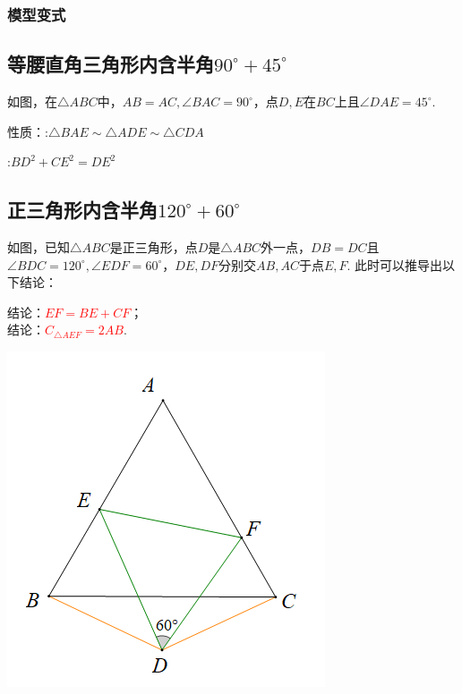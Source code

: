 \documentclass[10pt]{ctexart}
\begin{document}
\subsubsection{模型变式}



\subsection{等腰直角三角形内含半角$90^\circ +45^\circ$}
如图，在$\triangle ABC$中，$AB=AC,\angle BAC=90^\circ$，点$D,E$在$BC$上且$\angle DAE=45^\circ$.

性质：:$\triangle BAE \sim \triangle ADE \sim \triangle CDA$

:$BD^2+CE^2=DE^2$




\subsection{正三角形内含半角$120^\circ +60^\circ$}
\begin{minipage}{0.6\textwidth}
	如图，已知$\triangle ABC$是正三角形，点$D$是$\triangle ABC$外一点，$DB=DC$且$\angle BDC=120^\circ,\angle EDF=60^\circ$，$DE,DF$分别交$AB,AC$于点$E,F$.
	此时可以推导出以下结论：
	
	结论：\textcolor{red}{$EF=BE+CF$}；\\
	结论：\textcolor{red}{$C_{\triangle AEF}=2AB$}.
\end{minipage}\qquad\qquad
\begin{minipage}{0.4\textwidth}
\includegraphics[scale=0.4]{figure/banjiao10.PNG}
\end{minipage}
\end{document}
